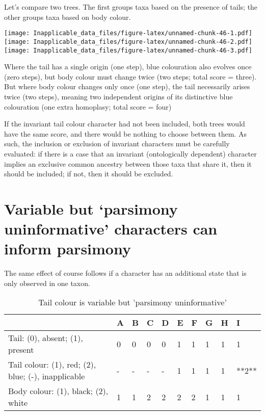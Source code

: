 \documentclass[]{book}
\theoremstyle{definition}
\theoremstyle{definition}
\theoremstyle{definition}
\theoremstyle{remark}
\begin{document}
Let's compare two trees. The first groups taxa based on the presence of
tails; the other groups taxa based on body colour.

\texttt{[image: Inapplicable\_data\_files/figure-latex/unnamed-chunk-46-1.pdf]}
\texttt{[image: Inapplicable\_data\_files/figure-latex/unnamed-chunk-46-2.pdf]}
\texttt{[image: Inapplicable\_data\_files/figure-latex/unnamed-chunk-46-3.pdf]}

Where the tail has a single origin (one step), blue colouration also
evolves once (zero steps), but body colour must change twice (two steps;
total score = three). But where body colour changes only once (one
step), the tail necessarily arises twice (two steps), meaning two
independent origins of its distinctive blue colouration (one extra
homoplasy; total score = four)

If the invariant tail colour character had not been included, both trees
would have the same score, and there would be nothing to choose between
them. As such, the inclusion or exclusion of invariant characters must
be carefully evaluated: if there is a case that an invariant
(ontologically dependent) character implies an exclusive common ancestry
between those taxa that share it, then it should be included; if not,
then it should be excluded.

\hypertarget{puip}{%
\section{Variable but `parsimony uninformative' characters can inform
parsimony}\label{puip}}

The same effect of course follows if a character has an additional state
that is only observed in one taxon.

\begin{table}

\caption{\label{tab:unnamed-chunk-47}Tail colour is variable but 'parsimony uninformative'}
\centering
\begin{tabular}[t]{l|l|l|l|l|l|l|l|l|l}
\hline
  & A & B & C & D & E & F & G & H & I\\
\hline
Tail: (0), absent; (1), present & 0 & 0 & 0 & 0 & 1 & 1 & 1 & 1 & 1\\
\hline
Tail colour: (1), red; (2), blue; (-), inapplicable & - & - & - & - & 1 & 1 & 1 & 1 & **2**\\
\hline
Body colour: (1), black; (2), white & 1 & 1 & 2 & 2 & 2 & 2 & 1 & 1 & 1\\
\hline
\end{tabular}
\end{table}
\end{document}
